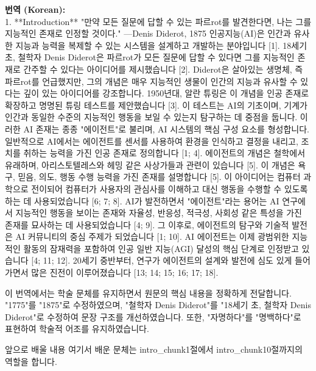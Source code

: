 \documentclass[12pt,a4paper]{article}
\begin{document}
\begin{mdframed}[style=ko]
\noindent\textbf{\small 번역 (Korean):}\\[2pt]
1. **Introduction**
   "만약 모든 질문에 답할 수 있는 파르rot를 발견한다면, 나는 그를 지능적인 존재로 인정할 것이다." —Denis Diderot, 1875
   인공지능(AI)은 인간과 유사한 지능과 능력을 복제할 수 있는 시스템을 설계하고 개발하는 분야입니다 [1]. 18세기 초, 철학자 Denis Diderot은 파르rot가 모든 질문에 답할 수 있다면 그를 지능적인 존재로 간주할 수 있다는 아이디어를 제시했습니다 [2]. Diderot은 살아있는 생명체, 즉 파르rot를 언급했지만, 그의 개념은 매우 지능적인 생물이 인간의 지능과 유사할 수 있다는 깊이 있는 아이디어를 강조합니다. 1950년대, 알란 튜링은 이 개념을 인공 존재로 확장하고 명명된 튜링 테스트를 제안했습니다 [3]. 이 테스트는 AI의 기초이며, 기계가 인간과 동일한 수준의 지능적인 행동을 보일 수 있는지 탐구하는 데 중점을 둡니다. 이러한 AI 존재는 종종 "에이전트"로 불리며, AI 시스템의 핵심 구성 요소를 형성합니다. 일반적으로 AI에서는 에이전트를 센서를 사용하여 환경을 인식하고 결정을 내리고, 조치를 취하는 능력을 가진 인공 존재로 정의합니다 [1; 4]. 에이전트의 개념은 철학에서 유래하며, 아리스토텔레스와 헤밍 같은 사상가들과 관련이 있습니다 [5]. 이 개념은 욕구, 믿음, 의도, 행동 수행 능력을 가진 존재를 설명합니다 [5]. 이 아이디어는 컴퓨터 과학으로 전이되어 컴퓨터가 사용자의 관심사를 이해하고 대신 행동을 수행할 수 있도록 하는 데 사용되었습니다 [6; 7; 8]. AI가 발전하면서 "에이전트"라는 용어는 AI 연구에서 지능적인 행동을 보이는 존재와 자율성, 반응성, 적극성, 사회성 같은 특성을 가진 존재를 묘사하는 데 사용되었습니다 [4; 9]. 그 이후로, 에이전트의 탐구와 기술적 발전은 AI 커뮤니티의 중심 주제가 되었습니다 [1; 10]. AI 에이전트는 이제 광범위한 지능적인 활동의 잠재력을 포함하여 인공 일반 지능(AGI) 달성의 핵심 단계로 인정받고 있습니다 [4; 11; 12]. 20세기 중반부터, 연구가 에이전트의 설계와 발전에 심도 있게 들어가면서 많은 진전이 이루어졌습니다 [13; 14; 15; 16; 17; 18].

이 번역에서는 학술 문체를 유지하면서 원문의 핵심 내용을 정확하게 전달합니다. "1775"를 "1875"로 수정하였으며, "철학자 Denis Diderot"를 "18세기 초, 철학자 Denis Diderot"로 수정하여 문장 구조를 개선하였습니다. 또한, "자명하다"를 "명백하다"로 표현하여 학술적 어조를 유지하였습니다.

\begin{previewbox}{앞으로 배울 내용}
  여기서 배운 문체는 intro_chunk1절에서 intro_chunk10절까지의 역할을 합니다.
\end{previewbox}

\end{mdframed}
\vspace{1em}
\end{document}
